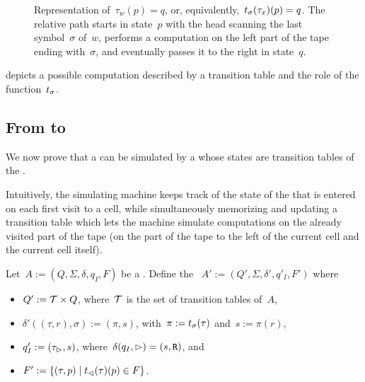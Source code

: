 \begin{figure}
	\centering
	
	\caption[A transition table and the function~$\trapp$.]{Representation of~$\tau_w(p)=q$, or, equivalently,~$t_\sigma(\tau_x)(p)=q$.
		The relative path starts in state~$p$ with the head scanning the last symbol~$\sigma$ of~$w$, performs a computation on the left part of the tape ending with~$\sigma$, and eventually passes it to the right in state~$q$.}
	\label{fig:transtab}
\end{figure}

 depicts a possible computation described by a transition table and the role of the function~$t_\sigma$.


\subsection{From \texorpdfstring{\TDFAs}{2DFAs} to \texorpdfstring{\ODFAs}{1DFAs}}
We now prove that a \TDFA can be simulated by a \ODFA whose states are transition tables of the \TDFA.

Intuitively, the simulating machine keeps track of the state of the \TDFA that is entered on each first visit to a cell, while simultaneously memorizing and updating a transition table which lets the machine simulate computations on the already visited part of the tape (\ie on the part of the tape to the left of the current cell and the current cell itself).

Let~$A:=(Q,\Sigma,\delta,q_I,F)$ be a \TDFA.
Define the \ODFA~$A':=(Q',\Sigma,\delta',q'_I,F')$ where
\begin{itemize}
	\item $Q':=\mathcal T\times Q$, where~$\mathcal T$ is the set of transition tables of~$A$,
	\item $\delta'((\tau,r),\sigma):=(\pi,s)$, with~$\pi:=t_\sigma(\tau)$ and~$s:=\pi(r)$,
	\item $q'_I:=(\tau_\rhd,s)$, where~$\delta(q_I,\rhd)=(s,\mathtt R)$, and
	\item $F':=\{(\tau,p)\mid t_\lhd(\tau)(p)\in F\}$.
\end{itemize}

